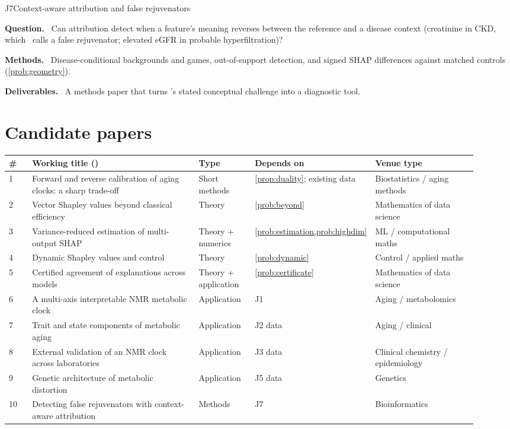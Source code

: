 \documentclass[11pt,a4paper]{article}
\newcommand{\field}[1]{\par\noindent\textbf{\color{navy}#1.}\ }
\theoremstyle{plain}
\theoremstyle{definition}
\theoremstyle{remark}
\newcommand{\tagbox}[2]{\tcbox[on line,boxsep=1pt,left=2pt,right=2pt,top=0pt,bottom=0pt,
  colback=#1!12!white,colframe=#1,boxrule=0.4pt,arc=1pt]{\scriptsize\bfseries\color{#1}#2}}
\newcommand{\PROP}{\tagbox{ochre}{PROPOSAL}}
\begin{document}
\begin{projectcard}{J7}{Context-aware attribution and false rejuvenators}
\label{card:J7}
\field{Question} Can attribution detect when a feature's meaning reverses between the reference and a disease context (creatinine in CKD, which \PI\ calls a false rejuvenator; elevated eGFR in probable hyperfiltration)?
\field{Methods} Disease-conditional backgrounds and games, out-of-support detection, and signed SHAP differences against matched controls (\cref{prob:geometry}).
\field{Deliverables} A methods paper that turns \PI's stated conceptual challenge into a diagnostic tool.
\end{projectcard}

\section{Candidate papers}
\label{sec:papers}

\begin{longtable}{@{}p{0.05\linewidth}p{0.36\linewidth}p{0.12\linewidth}p{0.17\linewidth}p{0.22\linewidth}@{}}
\toprule
\# & Working title (\PROP) & Type & Depends on & Venue type\\
\midrule\endhead
1 & Forward and reverse calibration of aging clocks: a sharp trade-off & Short methods & \cref{prop:duality}; existing data & Biostatistics / aging methods\\
2 & Vector Shapley values beyond classical efficiency & Theory & \cref{prob:beyond} & Mathematics of data science\\
3 & Variance-reduced estimation of multi-output SHAP & Theory + numerics & \cref{prob:estimation,prob:highdim} & ML / computational maths\\
4 & Dynamic Shapley values and control & Theory & \cref{prob:dynamic} & Control / applied maths\\
5 & Certified agreement of explanations across models & Theory + application & \cref{prob:certificate} & Mathematics of data science\\
6 & A multi-axis interpretable NMR metabolic clock & Application & J1 & Aging / metabolomics\\
7 & Trait and state components of metabolic aging & Application & J2 data & Aging / clinical\\
8 & External validation of an NMR clock across laboratories & Application & J3 data & Clinical chemistry / epidemiology\\
9 & Genetic architecture of metabolic distortion & Application & J5 data & Genetics\\
10 & Detecting false rejuvenators with context-aware attribution & Methods & J7 & Bioinformatics\\
\bottomrule
\end{longtable}
\end{document}
